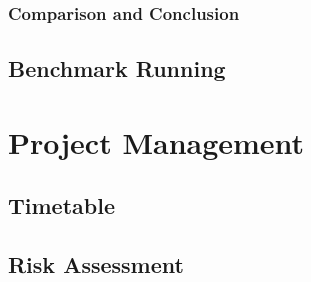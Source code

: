 \documentclass[12pt,a4paper]{article}
\begin{document}
            
            \subsubsection{Comparison and Conclusion}
            \label{ssub:comparison_and_conclusion}
            
            
        \subsection{Benchmark Running}
        \label{sub:benchmark_running}
        
    
    \section{Project Management}
    \label{sec:project_management}
    
        \subsection{Timetable}
        \label{sub:timetable}
        
        
        \subsection{Risk Assessment}
        \label{sub:risk_assessment}
        
        
\end{document}

